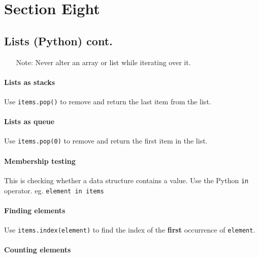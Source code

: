 \section{Section Eight}\label{sec:section_eight}

\subsection{Lists (Python) cont.}\label{sub:lists_python_cont_}

\begin{note}
	\begin{itemize}
		\item[Note:] Never alter an array or list while iterating over it.
	\end{itemize}
\end{note}

\paragraph{Lists as stacks}\label{par:lists_as_stacks}

Use \texttt{items.pop()} to remove and return the last item from the list.

\paragraph{Lists as queue}\label{par:lists_as_queue}

Use \texttt{items.pop(0)} to remove and return the first item in the list.

\paragraph{Membership testing}\label{par:membership_testing}

This is checking whether a data structure contains a value.
Use the Python \texttt{in} operator.
eg. \texttt{element in items}

\paragraph{Finding elements}\label{par:finding_elements}

Use \texttt{items.index(element)} to find the index of the \textbf{first} occurrence of \texttt{element}.

\paragraph{Counting elements}\label{par:counting_elements}

